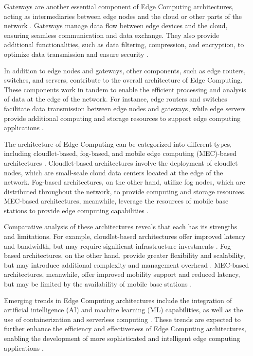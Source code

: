 \documentclass[11pt,a4paper]{article}
\begin{document}
Gateways are another essential component of Edge Computing architectures, acting as intermediaries between edge nodes and the cloud or other parts of the network \cite{arxiv:1808.05283}. Gateways manage data flow between edge devices and the cloud, ensuring seamless communication and data exchange. They also provide additional functionalities, such as data filtering, compression, and encryption, to optimize data transmission and ensure security \cite{arxiv:2004.07311}.

In addition to edge nodes and gateways, other components, such as edge routers, switches, and servers, contribute to the overall architecture of Edge Computing. These components work in tandem to enable the efficient processing and analysis of data at the edge of the network. For instance, edge routers and switches facilitate data transmission between edge nodes and gateways, while edge servers provide additional computing and storage resources to support edge computing applications \cite{arxiv:1702.06331}.

The architecture of Edge Computing can be categorized into different types, including cloudlet-based, fog-based, and mobile edge computing (MEC)-based architectures \cite{arxiv:1703.10750}. Cloudlet-based architectures involve the deployment of cloudlet nodes, which are small-scale cloud data centers located at the edge of the network. Fog-based architectures, on the other hand, utilize fog nodes, which are distributed throughout the network, to provide computing and storage resources. MEC-based architectures, meanwhile, leverage the resources of mobile base stations to provide edge computing capabilities \cite{arxiv:1702.05309}.

Comparative analysis of these architectures reveals that each has its strengths and limitations. For example, cloudlet-based architectures offer improved latency and bandwidth, but may require significant infrastructure investments \cite{arxiv:1710.11001}. Fog-based architectures, on the other hand, provide greater flexibility and scalability, but may introduce additional complexity and management overhead \cite{arxiv:1906.08452}. MEC-based architectures, meanwhile, offer improved mobility support and reduced latency, but may be limited by the availability of mobile base stations \cite{arxiv:1908.06849}.

Emerging trends in Edge Computing architectures include the integration of artificial intelligence (AI) and machine learning (ML) capabilities, as well as the use of containerization and serverless computing \cite{arxiv:1909.00560}. These trends are expected to further enhance the efficiency and effectiveness of Edge Computing architectures, enabling the development of more sophisticated and intelligent edge computing applications \cite{arxiv:1907.08349}.
\end{document}
